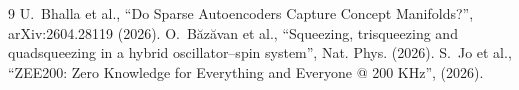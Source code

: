 \documentclass[12pt,a4paper]{article}
\begin{document}

\begin{thebibliography}{9}
 U.~Bhalla et al., ``Do Sparse Autoencoders Capture Concept Manifolds?'', arXiv:2604.28119 (2026).
 O.~Băzăvan et al., ``Squeezing, trisqueezing and quadsqueezing in a hybrid oscillator–spin system'', Nat. Phys. (2026).
 S.~Jo et al., ``ZEE200: Zero Knowledge for Everything and Everyone @ 200 KHz'', (2026).
\end{thebibliography}
\end{document}
